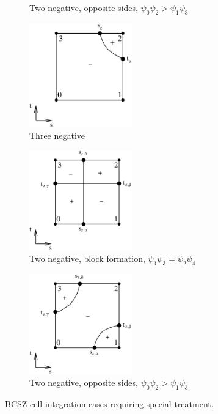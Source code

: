 \documentclass{mc2015}
\begin{document}
\begin{figure}[h]
\begin{center}
\begin{subfigure}{0.32\textwidth}
\begin{center}
		\caption{Two negative, opposite sides, $\psi_0 \psi_2 > \psi_1 \psi_3$}
		\label{fig:two_opp_more_positive}
		\end{center}
	\end{subfigure}
	\begin{subfigure}{0.32\textwidth}
		\begin{center}
		\includegraphics[width=1.75in]{three_neg_pdt_int} 
		\caption{Three negative}
		\label{fig:three_nodes}
		\end{center}
	\end{subfigure}
	\begin{subfigure}{0.32\textwidth}
		\begin{center}
		\includegraphics[width=1.75in]{opp_neg_block_pdt_int} 
		\caption{Two negative, block formation, $\psi_1 \psi_3 = \psi_2 \psi_4$}
		\label{fig:two_block}
		\end{center}
	\end{subfigure}
	\begin{subfigure}{0.32\textwidth}
		\begin{center}
		\includegraphics[width=1.75in]{opp_neg_more_neg_pdt_int}
		\caption{Two negative, opposite sides, $\psi_0 \psi_2 > \psi_1 \psi_3$}
		\label{fig:two_opp_negative}
		\end{center}
	\end{subfigure}
	\caption{BCSZ cell integration cases requiring special treatment.}
	\label{fig:bcsz_cases}
	\end{center}
\end{figure}
\end{document}
